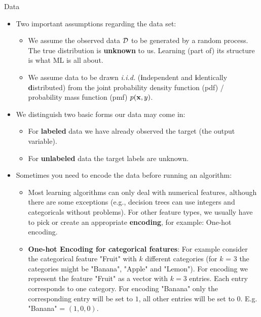 \documentclass[11pt,compress,t,notes=noshow, xcolor=table]{beamer}
\begin{document}
\begin{vbframe}{Data}
\begin{itemize}
\item Two important assumptions regarding the data set:
    \begin{itemize}
  
      \item We assume the observed data $\mathcal{D}$ to be generated by a random process. The true distribution is \textbf{unknown} to us. Learning (part of) its structure is what ML is all about. 
    
    \item We assume data to be drawn \emph{i.i.d.} (\textbf{i}ndependent and \textbf{i}dentically 
    \textbf{d}istributed) from the joint probability density function (pdf) / probability mass function (pmf) $p(\mathbf{x},y)$.
   \end{itemize}

\item We distinguish two basic forms our data may come in:
  
  \begin{itemize}
  
      \item For \textbf{labeled} data we have already observed the target (the output variable).
    
    \item For \textbf{unlabeled} data the target labels are unknown.
   \end{itemize}

\item Sometimes you need to encode the data before running an algorithm:
  
  \begin{itemize}   
    \item  \small Most learning algorithms can only deal with numerical features,
      although there are some exceptions (e.g., decision trees can use integers and categoricals without problems).
      For other feature types, we usually have to pick or create an
      appropriate \textbf{encoding}, for example: One-hot encoding.
     \item \small \textbf{One-hot Encoding for categorical features}: For example consider the categorical feature "Fruit" with $k$ different categories (for $k$ = 3 the categories might be "Banana", "Apple" and "Lemon"). For encoding we represent the feature "Fruit" as a vector with $k = 3$ entries. Each entry corresponds to one category. For encoding "Banana" only the corresponding entry will be set to $1$, all other entries will be set to $0$. E.g. "Banana" = $(1,0,0)$.
  

\end{itemize}
\end{itemize}
\end{vbframe}
\end{document}
